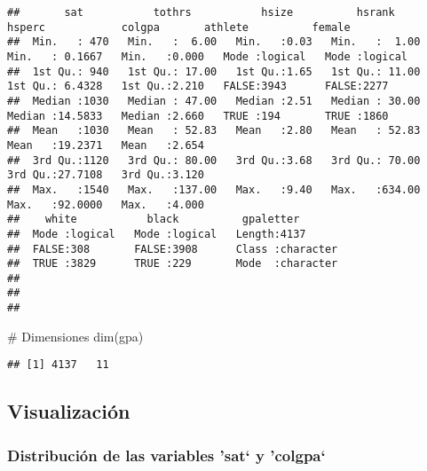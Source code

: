 \documentclass[
]{article}
\newenvironment{Shaded}{\begin{snugshade}}{\end{snugshade}}
\newcommand{\AttributeTok}[1]{\textcolor[rgb]{0.80,0.80,0.80}{#1}}
\newcommand{\CommentTok}[1]{\textcolor[rgb]{0.50,0.62,0.50}{#1}}
\newcommand{\FunctionTok}[1]{\textcolor[rgb]{0.94,0.94,0.56}{#1}}
\newcommand{\NormalTok}[1]{\textcolor[rgb]{0.80,0.80,0.80}{#1}}
\newcommand{\SpecialCharTok}[1]{\textcolor[rgb]{0.86,0.64,0.64}{#1}}
\newcommand{\StringTok}[1]{\textcolor[rgb]{0.80,0.58,0.58}{#1}}
\begin{document}
\begin{verbatim}
##       sat           tothrs           hsize          hsrank           hsperc            colgpa       athlete          female       
##  Min.   : 470   Min.   :  6.00   Min.   :0.03   Min.   :  1.00   Min.   : 0.1667   Min.   :0.000   Mode :logical   Mode :logical  
##  1st Qu.: 940   1st Qu.: 17.00   1st Qu.:1.65   1st Qu.: 11.00   1st Qu.: 6.4328   1st Qu.:2.210   FALSE:3943      FALSE:2277     
##  Median :1030   Median : 47.00   Median :2.51   Median : 30.00   Median :14.5833   Median :2.660   TRUE :194       TRUE :1860     
##  Mean   :1030   Mean   : 52.83   Mean   :2.80   Mean   : 52.83   Mean   :19.2371   Mean   :2.654                                  
##  3rd Qu.:1120   3rd Qu.: 80.00   3rd Qu.:3.68   3rd Qu.: 70.00   3rd Qu.:27.7108   3rd Qu.:3.120                                  
##  Max.   :1540   Max.   :137.00   Max.   :9.40   Max.   :634.00   Max.   :92.0000   Max.   :4.000                                  
##    white           black          gpaletter        
##  Mode :logical   Mode :logical   Length:4137       
##  FALSE:308       FALSE:3908      Class :character  
##  TRUE :3829      TRUE :229       Mode  :character  
##                                                    
##                                                    
## 
\end{verbatim}

\begin{Shaded}
\begin{Highlighting}[]
\CommentTok{\# Dimensiones}
\FunctionTok{dim}\NormalTok{(gpa)}
\end{Highlighting}
\end{Shaded}

\begin{verbatim}
## [1] 4137   11
\end{verbatim}

\hypertarget{visualizaciuxf3n}{%
\subsection{Visualización}\label{visualizaciuxf3n}}

\hypertarget{distribuciuxf3n-de-las-variables-sat-y-colgpa}{%
\subsubsection{Distribución de las variables 'sat` y
'colgpa`}\label{distribuciuxf3n-de-las-variables-sat-y-colgpa}}

\begin{Shaded}
\end{Shaded}
\end{document}

